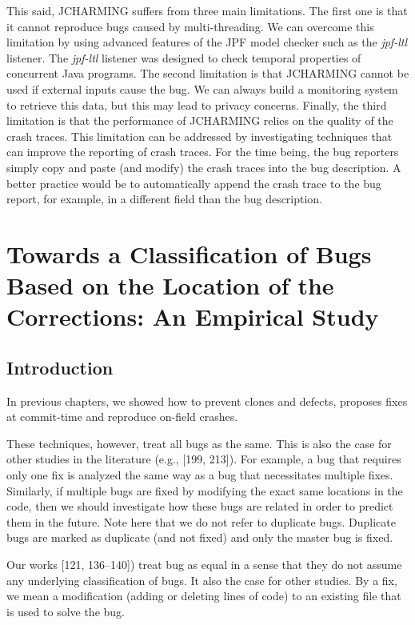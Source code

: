 \documentclass[12pt]{report}
\begin{document}
This said, JCHARMING suffers from three main limitations. The first one
is that it cannot reproduce bugs caused by multi-threading. We can
overcome this limitation by using advanced features of the JPF model
checker such as the \emph{jpf-ltl} listener. The \emph{jpf-ltl} listener
was designed to check temporal properties of concurrent Java programs.
The second limitation is that JCHARMING cannot be used if external
inputs cause the bug. We can always build a monitoring system to
retrieve this data, but this may lead to privacy concerns. Finally, the
third limitation is that the performance of JCHARMING relies on the
quality of the crash traces. This limitation can be addressed by
investigating techniques that can improve the reporting of crash traces.
For the time being, the bug reporters simply copy and paste (and modify)
the crash traces into the bug description. A better practice would be to
automatically append the crash trace to the bug report, for example, in
a different field than the bug description.

\chapter{Towards a Classification of Bugs Based on the Location of the
Corrections: An Empirical
Study}\label{towards-a-classification-of-bugs-based-on-the-location-of-the-corrections-an-empirical-study}

\section{Introduction}\label{introduction-6}

In previous chapters, we showed how to prevent clones and defects,
proposes fixes at commit-time and reproduce on-field crashes.

These techniques, however, treat all bugs as the same. This is also the
case for other studies in the literature (e.g., {[}199, 213{]}). For
example, a bug that requires only one fix is analyzed the same way as a
bug that necessitates multiple fixes. Similarly, if multiple bugs are
fixed by modifying the exact same locations in the code, then we should
investigate how these bugs are related in order to predict them in the
future. Note here that we do not refer to duplicate bugs. Duplicate bugs
are marked as duplicate (and not fixed) and only the master bug is
fixed.

Our works {[}121, 136--140{]}) treat bug as equal in a sense that they
do not assume any underlying classification of bugs. It also the case
for other studies. By a fix, we mean a modification (adding or deleting
lines of code) to an existing file that is used to solve the bug.
\end{document}
